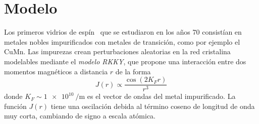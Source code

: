 \documentclass[11pt]{report}
\newcommand{\sub}[1]{ _{{\scriptscriptstyle \mathit{#1}}}  }
\begin{document}
\section{Modelo}
Los primeros vidrios de espín~\cite{canella} que se estudiaron en los
años 70 consistían en metales nobles impurificados con metales de
transición, como por ejemplo el CuMn. Las impurezas crean perturbaciones aleatorias en la
red cristalina modelables mediante el \emph{modelo RKKY}, que propone
una interacción entre dos momentos magnéticos a distancia $r$ de la forma
\begin{equation}
  J(r) ∝ \frac{\cos(2K\sub{F} r)}{r^3}
\end{equation}
donde $K\sub{F} ∼ \SI{1e10}{\per\metre}$ es el vector de ondas del
metal impurificado. La función $J(r)$ tiene una oscilación debida al
término coseno de longitud de onda muy corta, cambiando de signo a
escala atómica.
\end{document}
